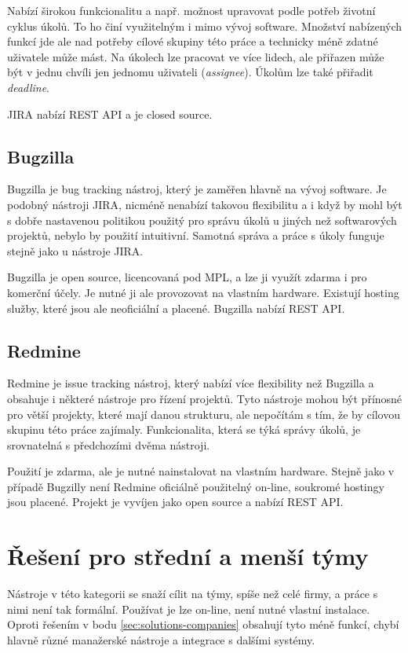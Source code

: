 \documentclass[thesis=B,czech]{FITthesis}[2012/06/26]
\begin{document}
			Nabízí širokou funkcionalitu a např. možnost upravovat podle potřeb životní cyklus úkolů. To ho činí využitelným i mimo vývoj software. Množství nabízených funkcí jde ale nad potřeby cílové skupiny této práce a technicky méně zdatné uživatele může mást. Na úkolech lze pracovat ve více lidech, ale přiřazen může být v jednu chvíli jen jednomu uživateli (\textit{assignee}). Úkolům lze také přiřadit \textit{deadline}.
			
			JIRA nabízí REST API a je closed source.
			
		\subsection{Bugzilla}
			Bugzilla \cite{bugzilla} je bug tracking nástroj, který je zaměřen hlavně na vývoj software. Je podobný nástroji JIRA, nicméně nenabízí takovou flexibilitu a i když by mohl být s dobře nastavenou politikou použitý pro správu úkolů u jiných než softwarových projektů, nebylo by použití intuitivní. Samotná správa a práce s úkoly funguje stejně jako u nástroje JIRA.
			
			Bugzilla je open source, licencovaná pod MPL, a lze ji využít zdarma i pro komerční účely. Je nutné ji ale provozovat na vlastním hardware. Existují hosting služby, které jsou ale neoficiální a placené. Bugzilla nabízí REST API.
			
		\subsection{Redmine}		
			Redmine \cite{redmine} je issue tracking nástroj, který nabízí více flexibility než Bugzilla a obsahuje i některé nástroje pro řízení projektů. Tyto nástroje mohou být přínosné pro větší projekty, které mají danou strukturu, ale nepočítám s tím, že by cílovou skupinu této práce zajímaly. Funkcionalita, která se týká správy úkolů, je srovnatelná s předchozími dvěma nástroji.
			
			Použití je zdarma, ale je nutné nainstalovat na vlastním hardware. Stejně jako v případě Bugzilly není Redmine oficiálně použitelný on-line, soukromé hostingy jsou placené. Projekt je vyvíjen jako open source a nabízí REST API.

	\section{Řešení pro střední a menší týmy}
		\label{sec:solutions-teams}
		Nástroje v této kategorii se snaží cílit na týmy, spíše než celé firmy, a práce s nimi není tak formální. Používat je lze on-line, není nutné vlastní instalace. Oproti řešením v bodu \ref{sec:solutions-companies} obsahují tyto méně funkcí, chybí hlavně různé manažerské nástroje a integrace s dalšími systémy.
	
\end{document}
